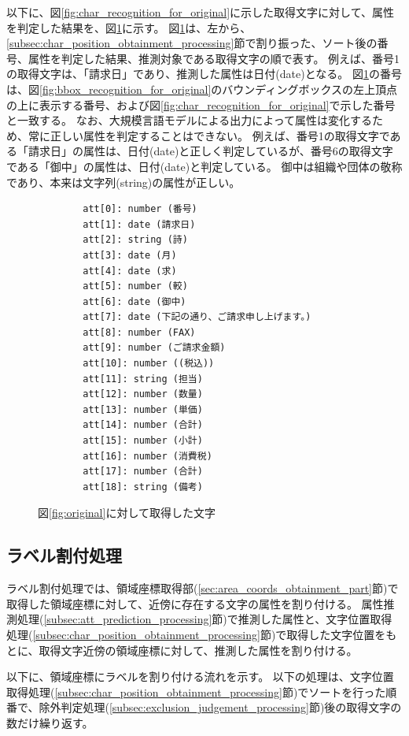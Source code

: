 以下に、図\ref{fig:char_recognition_for_original}に示した取得文字に対して、属性を判定した結果を、図\ref{fig:predict_att_for_original}に示す。
図\ref{fig:predict_att_for_original}は、左から、\ref{subsec:char_position_obtainment_processing}節で割り振った、ソート後の番号、属性を判定した結果、推測対象である取得文字の順で表す。
例えば、番号1の取得文字は、「請求日」であり、推測した属性は日付(date)となる。
図\ref{fig:predict_att_for_original}の番号は、図\ref{fig:bbox_recognition_for_original}のバウンディングボックスの左上頂点の上に表示する番号、および図\ref{fig:char_recognition_for_original}で示した番号と一致する。
なお、大規模言語モデルによる出力によって属性は変化するため、常に正しい属性を判定することはできない。
例えば、番号1の取得文字である「請求日」の属性は、日付(date)と正しく判定しているが、番号6の取得文字である「御中」の属性は、日付(date)と判定している。
御中は組織や団体の敬称であり、本来は文字列(string)の属性が正しい。

\lstset{language=}
\begin{figure}[t]
    \begin{lstlisting}
        att[0]: number (番号)
        att[1]: date (請求日)
        att[2]: string (詩)
        att[3]: date (月)
        att[4]: date (求)
        att[5]: number (較)
        att[6]: date (御中)
        att[7]: date (下記の通り、ご請求申し上げます。)
        att[8]: number (FAX)
        att[9]: number (ご請求金額)
        att[10]: number ((税込))
        att[11]: string (担当)
        att[12]: number (数量)
        att[13]: number (単価)
        att[14]: number (合計)
        att[15]: number (小計)
        att[16]: number (消費税)
        att[17]: number (合計)
        att[18]: string (備考)
    \end{lstlisting}
    \caption{図\ref{fig:original}に対して取得した文字}
    \label{fig:predict_att_for_original}
\end{figure}

\subsection{ラベル割付処理}\label{subsec:label_link_processing}
ラベル割付処理では、領域座標取得部(\ref{sec:area_coords_obtainment_part}節)で取得した領域座標に対して、近傍に存在する文字の属性を割り付ける。
属性推測処理(\ref{subsec:att_prediction_processing}節)で推測した属性と、文字位置取得処理(\ref{subsec:char_position_obtainment_processing}節)で取得した文字位置をもとに、取得文字近傍の領域座標に対して、推測した属性を割り付ける。

以下に、領域座標にラベルを割り付ける流れを示す。
以下の処理は、文字位置取得処理(\ref{subsec:char_position_obtainment_processing}節)でソートを行った順番で、除外判定処理(\ref{subsec:exclusion_judgement_processing}節)後の取得文字の数だけ繰り返す。

